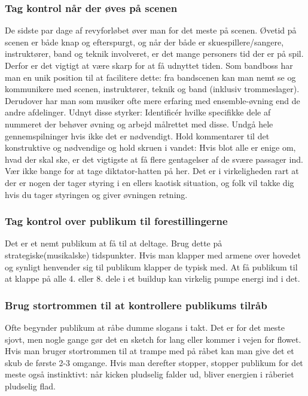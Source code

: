 \subsubsection{Tag kontrol når der øves på scenen}
De sidste par dage af revyforløbet øver man for det meste på scenen. Øvetid på scenen er både knap og efterspurgt, og når der både er skuespillere/sangere, instruktører, band og teknik involveret, er det mange personers tid der er på spil. Derfor er det vigtigt at være skarp for at få udnyttet tiden. Som bandboss har man en unik position til at facilitere dette: fra bandscenen kan man nemt se og kommunikere med scenen, instruktører, teknik og band (inklusiv trommeslager). Derudover har man som musiker ofte mere erfaring med ensemble-øvning end de andre afdelinger.
Udnyt disse styrker: Identificér hvilke specifikke dele af nummeret der behøver øvning og arbejd målrettet med disse. Undgå hele gennemspilninger hvis ikke det er nødvendigt. Hold kommentarer til det konstruktive og nødvendige og hold skruen i vandet: Hvis blot alle er enige om, hvad der skal ske, er det vigtigste at få flere gentagelser af de svære passager ind.
Vær ikke bange for at tage diktator-hatten på her. Det er i virkeligheden rart at der er nogen der tager styring i en ellers kaotisk situation, og folk vil takke dig hvis du tager styringen og giver øvningen retning.

\subsubsection{Tag kontrol over publikum til forestillingerne}
Det er et nemt publikum at få til at deltage. Brug dette på strategiske(musikalske) tidspunkter. Hvis man klapper med armene over hovedet og synligt henvender sig til publikum klapper de typisk med. At få publikum til at klappe på alle 4. eller 8. dele i et buildup kan virkelig pumpe energi ind i det.\\

\subsubsection{Brug stortrommen til at kontrollere publikums tilråb}
Ofte begynder publikum at råbe dumme slogans i takt. Det er for det meste sjovt, men nogle gange gør det en sketch for lang eller kommer i vejen for flowet. Hvis man bruger stortrommen til at trampe med på råbet kan man give det et skub de første 2-3 omgange. Hvis man derefter stopper, stopper publikum for det meste også instinktivt: når kicken pludselig falder ud, bliver energien i råberiet pludselig flad.

